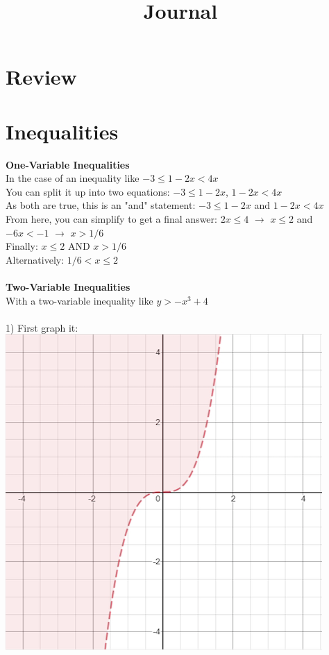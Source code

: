 \documentclass{article}
\begin{document}
	
	\setlength{\droptitle}{-5em}
	\title{Journal}
	\date{}
	\author{}
	\maketitle
	
	\section{Review}
	\section*{Inequalities}
	\textbf{One-Variable Inequalities}\\ 
	In the case of an inequality like  $-3 \leq 1-2x < 4x$ \\
	You can split it up into two equations:  $-3 \leq 1-2x$, $1-2x < 4x$\\
	As both are true, this is an "and" statement: 
	$-3 \leq 1-2x$ and $1-2x < 4x$ \\
	From here, you can simplify to get a final answer: 
	$2x \leq 4$ $\rightarrow$ $x \leq 2$ and $-6x < -1$ $\rightarrow$ $x > 1/6$ \\
	Finally: 
	$x \leq 2$ AND $x > 1/6$\\
	Alternatively: $1/6 < x \leq 2$ \\\\
	\textbf{Two-Variable Inequalities}\\ 
	With a two-variable inequality like $y > -x^3 +4$ \\\\
	1) First graph it: \\
	\includegraphics[scale=0.30]{pics/j92v1}
\end{document}
